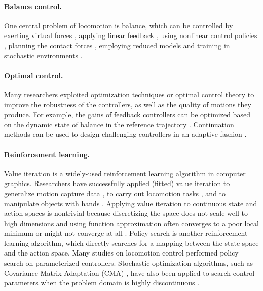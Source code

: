 \paragraph{Balance control.} One central problem of locomotion is balance, which can be controlled by exerting virtual forces \cite{Pratt2001,Coros2010}, applying linear feedback \cite{Laszlo:1996,Yin:2007,daSilva:2008,Coros2010}, using nonlinear control policies \cite{Muico:2009}, planning the contact forces \cite{Muico:2009,Tan:2012}, employing reduced models \cite{Tsai:2010,Kwon:2010,mordatch2010,Coros2010,Ye:2010} and training in stochastic environments \cite{Wang:2010}.

\paragraph{Optimal control.} Many researchers exploited optimization techniques or optimal control theory to improve the robustness of the controllers, as well as the quality
of motions they produce. For example, the gains of feedback
controllers can be optimized based on the dynamic state of balance in
the reference trajectory
\cite{daSilva:2008:ISS,Muico:2009:CAN,Ye:2010:SRM}. Continuation methods can be
used to design challenging controllers in an adaptive fashion
\cite{Yin:2008:CMA}.

\paragraph{Reinforcement learning.} Value iteration is a widely-used reinforcement learning algorithm in computer graphics. Researchers have successfully applied (fitted) value iteration to generalize motion capture data \cite{Treuille:2007:NCA,Levine:2012:CCC}, to carry out locomotion tasks \cite{Coros:2009:RTC}, and to manipulate objects with hands \cite{Multifinger2013}. Applying value iteration to continuous state and action spaces is nontrivial because discretizing the space does not scale well to high dimensions \cite{Sutton:1998:IRL} and using function approximation often converges to a poor local minimum or might not converge at all \cite{Thrun93issuesin,Boyan95generalizationin}. Policy search \cite{Ng:2000:PPS} is another reinforcement learning algorithm, which directly searches for a mapping between the state space and the action space. Many studies on locomotion control \cite{Yin08,Wang:2009,Coros:2011,Tan:2011,Wang:2012,Geijtenbeek:2013} performed policy search on parameterized controllers. Stochastic optimization algorithms, such as
Covariance Matrix Adaptation (CMA) \cite{hansen2004evaluating}, have also been applied to
search control parameters when the problem domain is highly discontinuous
\cite{Wu:2010:TAB,Wang:2010:OWC,Mordatch:2010:RPL}.

